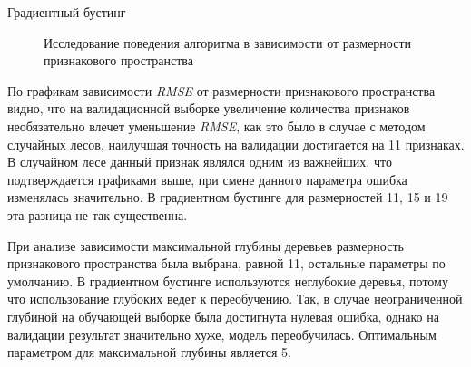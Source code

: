\documentclass[12pt]{article}
\begin{document}
\begin{section}{Градиентный бустинг}
\begin{figure}[h!]
\begin{minipage}[h]{0.5\linewidth}
\end{minipage}
\caption{Исследование поведения алгоритма в зависимости от размерности признакового пространства}
\label{ris:image1}
\end{figure}

По графикам зависимости \emph{RMSE} от размерности признакового пространства видно, что на валидационной выборке увеличение количества признаков необязательно влечет уменьшение \emph{RMSE}, как это было в случае с методом случайных лесов, наилучшая точность на валидации достигается на 11 признаках. В случайном лесе данный признак являлся одним из важнейших, что подтверждается графиками выше, при смене данного параметра ошибка изменялась значительно. В градиентном бустинге для размерностей 11, 15 и 19 эта разница не так существенна.


При анализе зависимости максимальной глубины деревьев размерность признакового пространства была выбрана, равной 11, остальные параметры по умолчанию. В градиентном бустинге используются неглубокие деревья, потому что использование глубоких ведет к переобучению. Так, в случае неограниченной глубиной на обучающей выборке была достигнута нулевая ошибка, однако на валидации результат значительно хуже, модель переобучилась. Оптимальным параметром для максимальной глубины является 5. 


\end{section}
\end{document}
